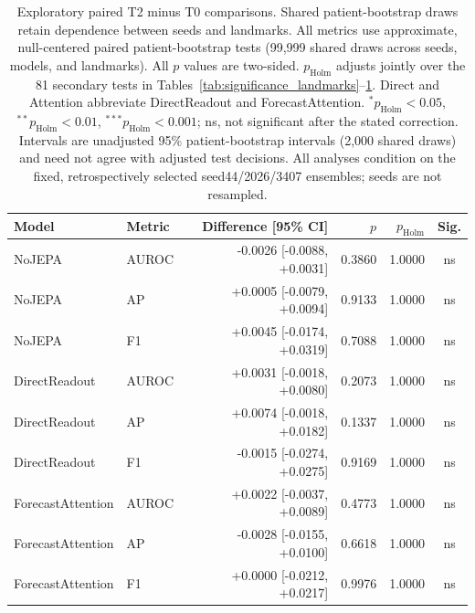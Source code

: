 \begin{table}[t]
\centering
\small
\caption{Exploratory paired T2 minus T0 comparisons. Shared patient-bootstrap draws retain dependence between seeds and landmarks. All metrics use approximate, null-centered paired patient-bootstrap tests (99,999 shared draws across seeds, models, and landmarks). All $p$ values are two-sided. $p_{\mathrm{Holm}}$ adjusts jointly over the 81 secondary tests in Tables~\ref{tab:significance_landmarks}--\ref{tab:significance_longitudinal}. Direct and Attention abbreviate DirectReadout and ForecastAttention. $^{*}p_{\mathrm{Holm}}<0.05$, $^{**}p_{\mathrm{Holm}}<0.01$, $^{***}p_{\mathrm{Holm}}<0.001$; ns, not significant after the stated correction. Intervals are unadjusted 95\% patient-bootstrap intervals (2,000 shared draws) and need not agree with adjusted test decisions. All analyses condition on the fixed, retrospectively selected seed44/2026/3407 ensembles; seeds are not resampled.}
\label{tab:significance_longitudinal}
\begin{tabular}{llrrrc}
\toprule
Model & Metric & Difference [95\% CI] & $p$ & $p_{\mathrm{Holm}}$ & Sig. \\
\midrule
NoJEPA & AUROC & -0.0026 [-0.0088, +0.0031] & 0.3860 & 1.0000 & ns \\
NoJEPA & AP & +0.0005 [-0.0079, +0.0094] & 0.9133 & 1.0000 & ns \\
NoJEPA & F1 & +0.0045 [-0.0174, +0.0319] & 0.7088 & 1.0000 & ns \\
DirectReadout & AUROC & +0.0031 [-0.0018, +0.0080] & 0.2073 & 1.0000 & ns \\
DirectReadout & AP & +0.0074 [-0.0018, +0.0182] & 0.1337 & 1.0000 & ns \\
DirectReadout & F1 & -0.0015 [-0.0274, +0.0275] & 0.9169 & 1.0000 & ns \\
ForecastAttention & AUROC & +0.0022 [-0.0037, +0.0089] & 0.4773 & 1.0000 & ns \\
ForecastAttention & AP & -0.0028 [-0.0155, +0.0100] & 0.6618 & 1.0000 & ns \\
ForecastAttention & F1 & +0.0000 [-0.0212, +0.0217] & 0.9976 & 1.0000 & ns \\
\bottomrule
\end{tabular}
\end{table}
